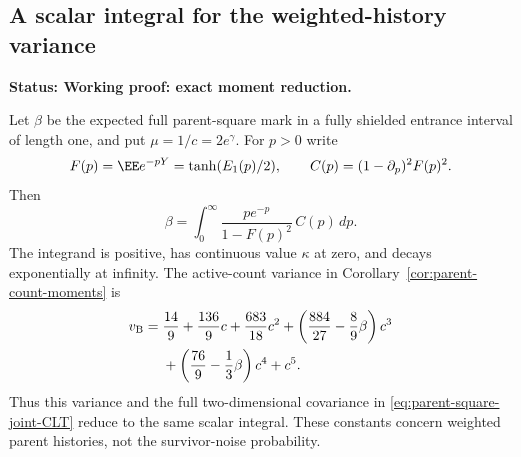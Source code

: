 \documentclass[11pt,letterpaper]{article}
\newcommand{\status}[1]{\textbf{Status: #1.}}
\begin{document}
\subsection{A scalar integral for the weighted-history variance}
\label{sec:weighted-history-integral}

\status{Working proof: exact moment reduction}

\begin{proposition}
\label{prop:weighted-history-integral}
Let $\beta$ be the expected full parent-square mark in a fully
shielded entrance interval of length one, and put $\mu=1/c=2e^\gamma$.
For $p>0$ write
\[
 F(p)=\EE e^{-pY}=\tanh(E_1(p)/2),\qquad
 C(p)=(1-\partial_p)^2F(p)^2.
\]
Then
\begin{equation}\label{eq:parent-beta-integral}
 \beta=\int_0^\infty
        \frac{p e^{-p}}{1-F(p)^2}\,C(p)\,dp.
\end{equation}
The integrand is positive, has continuous value $\kappa$ at
zero, and decays exponentially at infinity. The active-count
variance in Corollary~\ref{cor:parent-count-moments} is
\begin{equation}\label{eq:parent-variance-polynomial}
 \begin{split}
 v_{\rm B}={}&\frac{14}{9}+\frac{136}{9}c
       +\frac{683}{18}c^2
       +\left(\frac{884}{27}-\frac89\beta\right)c^3\\
       &+\left(\frac{76}{9}-\frac13\beta\right)c^4+c^5.
 \end{split}
\end{equation}
Thus this variance and the full two-dimensional covariance in
\eqref{eq:parent-square-joint-CLT} reduce to the same scalar
integral. These constants concern weighted parent histories,
not the survivor-noise probability.
\end{proposition}
\end{document}
